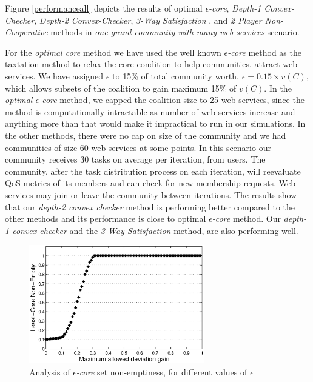 Figure \ref{performanceall} depicts the results of optimal
\emph{$\epsilon$-core}, \emph{Depth-1 Convex-Checker},
\emph{Depth-2 Convex-Checker}, \emph{3-Way Satisfaction}
\cite{DBLP:conf/IEEEscc/LimTMB12}, and \emph{2 Player
Non-Cooperative} \cite{DBLP:conf/IEEEscc/KhosravifarABT11} methods
in \emph{one grand community with many web services} scenario.

For the \emph{optimal core} method we have used the well known \emph{$\epsilon$-core} method as the
taxtation method to relax the core condition to help communities, attract web services.
We have assigned $\epsilon$ to 15\% of total community worth, $\epsilon = 0.15 \times v(C)$, which allows
subsets of the coalition to gain maximum 15\% of $v(C)$. In the
\emph{optimal $\epsilon$-core} method, we capped the coalition
size to 25 web services, since the method is computationally
intractable as number of web services increase and anything more than that would make it
impractical to run in our simulations. In the other methods, there
were no cap on size of the community and we had communities of
size 60 web services at some points. In this scenario our community receives 30 tasks on average per iteration, from users. The community, after the task distribution process on each iteration, will reevaluate QoS metrics of its members and can check for new membership requests. Web services may join or leave the community between iterations. The results show that our
\emph{depth-2 convex checker} method is performing better compared
to the other methods and its performance is close to optimal
\emph{$\epsilon$-core} method. Our \emph{depth-1 convex checker}
and the \emph{3-Way Satisfaction} method, are also performing well.

\begin{figure}[!t]
\centering
\includegraphics[width=3in]{Figures/least_core.eps}
\caption{Analysis of \emph{$\epsilon$-core} set non-emptiness, for different values of $\epsilon$} \label{f_leastcore}
\end{figure}

